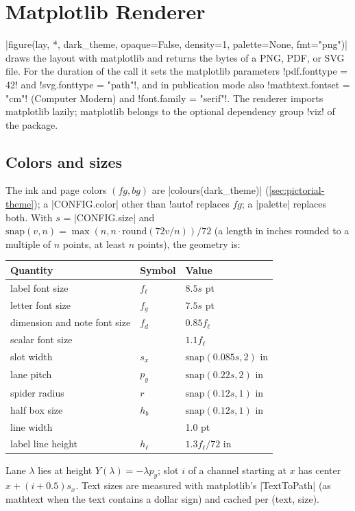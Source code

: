 {\section{Matplotlib Renderer}\label{sec:pictorial-figure}

\py|figure(lay, *, dark_theme, opaque=False, density=1, palette=None, fmt="png")| draws the
layout with matplotlib and returns the bytes of a PNG, PDF, or SVG file. For the duration of the
call it sets the matplotlib parameters \code!pdf.fonttype = 42! and
\code!svg.fonttype = "path"!, and in publication mode also \code!mathtext.fontset = "cm"!
(Computer Modern) and \code!font.family = "serif"!. The renderer imports matplotlib lazily;
matplotlib belongs to the optional dependency group \code!viz! of the package.

\subsection{Colors and sizes}\label{sec:pictorial-figure-geometry}

The ink and page colors $(\mathit{fg}, \mathit{bg})$ are \py|colours(dark_theme)|
(\cref{sec:pictorial-theme}); a \py|CONFIG.color| other than \code!auto! replaces $\mathit{fg}$;
a \py|palette| replaces both. With $s$ = \py|CONFIG.size| and
$\mathrm{snap}(v, n) = \max(n, n\cdot\mathrm{round}(72v/n))/72$ (a length in inches rounded to a
multiple of $n$ points, at least $n$ points), the geometry is:
\begin{center}
\begin{tabular}{@{}lll@{}}
\toprule
Quantity & Symbol & Value \\
\midrule
label font size & $f_\ell$ & $8.5s$ pt \\
letter font size & $f_g$ & $7.5s$ pt \\
dimension and note font size & $f_d$ & $0.85 f_\ell$ \\
scalar font size & & $1.1 f_\ell$ \\
slot width & $s_x$ & $\mathrm{snap}(0.085s, 2)$ in \\
lane pitch & $p_y$ & $\mathrm{snap}(0.22s, 2)$ in \\
spider radius & $r$ & $\mathrm{snap}(0.12s, 1)$ in \\
half box size & $h_b$ & $\mathrm{snap}(0.12s, 1)$ in \\
line width & & 1.0 pt \\
label line height & $h_\ell$ & $1.3 f_\ell/72$ in \\
\bottomrule
\end{tabular}
\end{center}
Lane $\lambda$ lies at height $Y(\lambda) = -\lambda p_y$; slot $i$ of a channel starting at $x$
has center $x + (i+0.5)s_x$. Text sizes are measured with matplotlib's \py|TextToPath| (as
mathtext when the text contains a dollar sign) and cached per (text, size).

}
